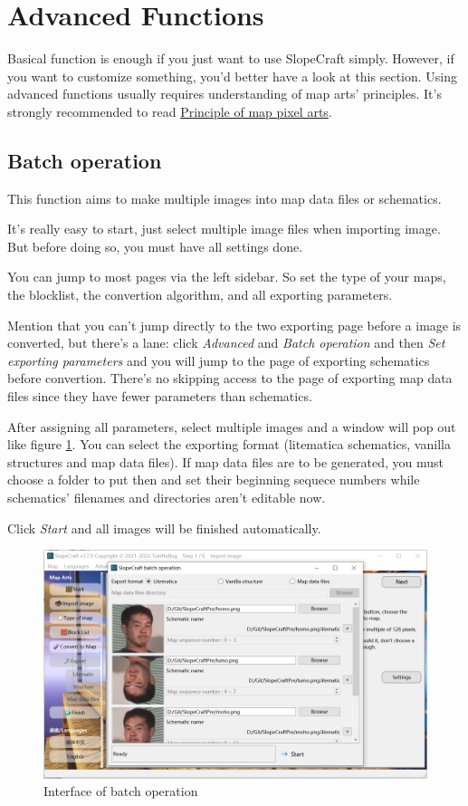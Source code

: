 \documentclass{article}
\begin{document}
\pagebreak
\section{Advanced Functions}
Basical function is enough if you just want to use SlopeCraft simply. However, if you want to customize something, you'd better have a look at this section. Using advanced functions usually requires understanding of map arts' principles. It's strongly recommended to read \href{https://github.com/ToKiNoBug/SlopeCraftTutorial/blob/main/BasicPrinciple/Principle%20of%20map%20pixel%20arts.md}{Principle of map pixel arts}.

\subsection{Batch operation}
\label{BatchOp}
This function aims to make multiple images into map data files or schematics.

It's really easy to start, just select multiple image files when importing image. But before doing so, you must have all settings done.

You can jump to most pages via the left sidebar. So set the type of your maps, the blocklist, the convertion algorithm, and all exporting parameters.

Mention that you can't jump directly to the two exporting page before a image is converted, but there's a lane: click \textit{Advanced} and \textit{Batch operation} and then \textit{Set exporting parameters} and you will jump to the page of exporting schematics before convertion. There's no skipping access to the page of exporting map data files since they have fewer parameters than schematics.

After assigning all parameters, select multiple images and a window will pop out like figure \ref*{BatchUi}. You can select the exporting format (litematica schematics, vanilla structures and map data files). If map data files are to be generated, you must choose a folder to put then and set their beginning sequece numbers while schematics' filenames and directories aren't editable now.

Click \textit{Start} and all images will be finished automatically.

\begin{figure}[htbp]
    \centering
    \includegraphics[width=15cm]{Img12_BatchOp.png}
    \caption{Interface of batch operation}
    \label{BatchUi}
\end{figure}
\end{document}
